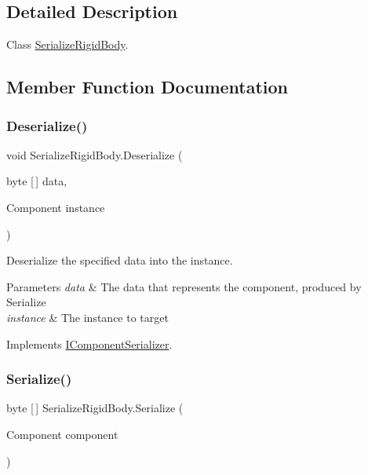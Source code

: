 \subsection{Detailed Description}
Class \hyperlink{class_serialize_rigid_body}{Serialize\+Rigid\+Body}. 



\subsection{Member Function Documentation}
\mbox{\label{class_serialize_rigid_body_a5d6e7d0282184b45b23d579b872e89a2}} 
\subsubsection{\texorpdfstring{Deserialize()}{Deserialize()}}
{\footnotesize\ttfamily void Serialize\+Rigid\+Body.\+Deserialize (\begin{DoxyParamCaption}\item[{byte \mbox{[}$\,$\mbox{]}}]{data,  }\item[{Component}]{instance }\end{DoxyParamCaption})\hspace{0.3cm}{\ttfamily [inline]}}



Deserialize the specified data into the instance. 


\begin{DoxyParams}{Parameters}
{\em data} & The data that represents the component, produced by Serialize\\
\hline
{\em instance} & The instance to target\\
\hline
\end{DoxyParams}


Implements \hyperlink{interface_i_component_serializer_a4cc366a5c78b33d47a90c209d8fed883}{I\+Component\+Serializer}.

\mbox{\label{class_serialize_rigid_body_a5b70b8af5b0b775bc961eb553a36b438}} 
\subsubsection{\texorpdfstring{Serialize()}{Serialize()}}
{\footnotesize\ttfamily byte \mbox{[}$\,$\mbox{]} Serialize\+Rigid\+Body.\+Serialize (\begin{DoxyParamCaption}\item[{Component}]{component }\end{DoxyParamCaption})\hspace{0.3cm}{\ttfamily [inline]}}



